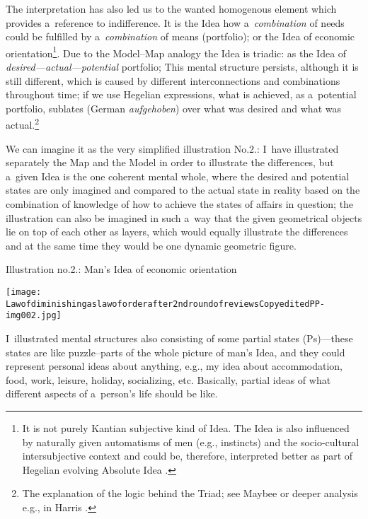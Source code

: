 The interpretation has also led us to the wanted homogenous element which provides a~reference to indifference. It is the Idea how a~\textit{combination} of needs could be fulfilled by a~\textit{combination} of means (portfolio); or the Idea of economic orientation\footnote{It is not purely Kantian subjective kind of Idea. The Idea is also influenced by naturally given automatisms of men (e.g., instincts) and the socio-cultural intersubjective context and could be, therefore, interpreted better as part of Hegelian evolving Absolute Idea 
\parencite[see interpretation of][]{}. %
 }. Due to the Model–Map analogy the Idea is triadic: as the Idea of \textit{desired---actual---potential} portfolio; This mental structure persists, although it is still different, which is caused by different interconnections and combinations throughout time; if we use Hegelian expressions, what is achieved, as a~potential portfolio, sublates (German \textit{aufgehoben}) over what was desired and what was actual.\footnote{The explanation of the logic behind the Triad; see Maybee 
\parencite*[][]{} %
 or deeper analysis e.g., in Harris 
\parencite*[][]{}.%
}



We can imagine it as the very simplified illustration No.2.: I~have illustrated separately the Map and the Model in order to illustrate the differences, but a~given Idea is the one coherent mental whole, where the desired and potential states are only imagined and compared to the actual state in reality based on the combination of knowledge of how to achieve the states of affairs in question; the illustration can also be imagined in such a~way that the given geometrical objects lie on top of each other as layers, which would equally illustrate the differences and at the same time they would be one dynamic geometric figure.



Illustration no.2.: Man's Idea of economic orientation



\texttt{[image: Lawofdiminishingaslawoforderafter2ndroundofreviewsCopyeditedPP-img002.jpg]}



I~illustrated mental structures also consisting of some partial states (Ps)---these states are like puzzle–parts of the whole picture of man's Idea, and they could represent personal ideas about anything, e.g., my idea about accommodation, food, work, leisure, holiday, socializing, etc. Basically, partial ideas of what different aspects of a~person's life should be like.



